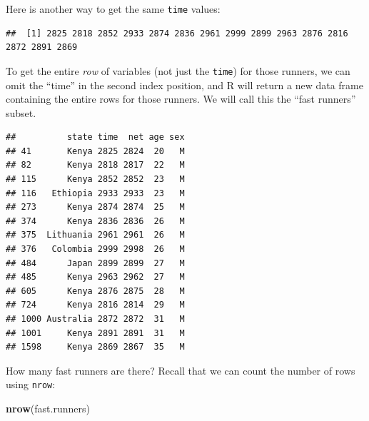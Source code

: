 \documentclass[
]{article}
\newenvironment{Shaded}{\begin{snugshade}}{\end{snugshade}}
\newcommand{\DecValTok}[1]{\textcolor[rgb]{0.00,0.00,0.81}{#1}}
\newcommand{\FunctionTok}[1]{\textcolor[rgb]{0.13,0.29,0.53}{\textbf{#1}}}
\newcommand{\NormalTok}[1]{#1}
\newcommand{\OtherTok}[1]{\textcolor[rgb]{0.56,0.35,0.01}{#1}}
\newcommand{\SpecialCharTok}[1]{\textcolor[rgb]{0.81,0.36,0.00}{\textbf{#1}}}
\begin{document}
Here is another way to get the same \texttt{time} values:

\begin{Shaded}
\end{Shaded}

\begin{verbatim}
##  [1] 2825 2818 2852 2933 2874 2836 2961 2999 2899 2963 2876 2816 2872 2891 2869
\end{verbatim}

To get the entire \emph{row} of variables (not just the \texttt{time})
for those runners, we can omit the ``time'' in the second index
position, and R will return a new data frame containing the entire rows
for those runners. We will call this the ``fast runners'' subset.

\begin{Shaded}
\end{Shaded}

\begin{verbatim}
##          state time  net age sex
## 41       Kenya 2825 2824  20   M
## 82       Kenya 2818 2817  22   M
## 115      Kenya 2852 2852  23   M
## 116   Ethiopia 2933 2933  23   M
## 273      Kenya 2874 2874  25   M
## 374      Kenya 2836 2836  26   M
## 375  Lithuania 2961 2961  26   M
## 376   Colombia 2999 2998  26   M
## 484      Japan 2899 2899  27   M
## 485      Kenya 2963 2962  27   M
## 605      Kenya 2876 2875  28   M
## 724      Kenya 2816 2814  29   M
## 1000 Australia 2872 2872  31   M
## 1001     Kenya 2891 2891  31   M
## 1598     Kenya 2869 2867  35   M
\end{verbatim}

How many fast runners are there? Recall that we can count the number of
rows using \texttt{nrow}:

\begin{Shaded}
\begin{Highlighting}[]
\FunctionTok{nrow}\NormalTok{(fast.runners)}
\end{Highlighting}
\end{Shaded}
\end{document}

